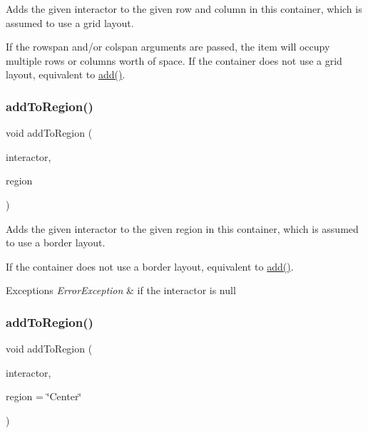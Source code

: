 Adds the given interactor to the given row and column in this container, which is assumed to use a grid layout. 

If the rowspan and/or colspan arguments are passed, the item will occupy multiple rows or columns\textquotesingle{} worth of space. If the container does not use a grid layout, equivalent to \mbox{\hyperlink{classGContainer_a6f99b7c841256dbdc5acaafbbca4e685}{add()}}. \mbox{\label{classGContainer_aab55413917cdbb2e0560ab415d59fd1f}} 
\subsubsection{\texorpdfstring{add\+To\+Region()}{addToRegion()}\hspace{0.1cm}{\footnotesize\ttfamily [1/4]}}
{\footnotesize\ttfamily void add\+To\+Region (\begin{DoxyParamCaption}\item[{\mbox{\hyperlink{classGInteractor}{G\+Interactor}} $\ast$}]{interactor,  }\item[{\mbox{\hyperlink{classGContainer_a81a01a86de31071a92e6cce0bab9bc4b}{Region}}}]{region }\end{DoxyParamCaption})\hspace{0.3cm}{\ttfamily [virtual]}}



Adds the given interactor to the given region in this container, which is assumed to use a border layout. 

If the container does not use a border layout, equivalent to \mbox{\hyperlink{classGContainer_a6f99b7c841256dbdc5acaafbbca4e685}{add()}}. 
\begin{DoxyExceptions}{Exceptions}
{\em Error\+Exception} & if the interactor is null \\
\hline
\end{DoxyExceptions}
\mbox{\label{classGContainer_a9c8e600889001e6e72d3548918a6baff}} 
\subsubsection{\texorpdfstring{add\+To\+Region()}{addToRegion()}\hspace{0.1cm}{\footnotesize\ttfamily [2/4]}}
{\footnotesize\ttfamily void add\+To\+Region (\begin{DoxyParamCaption}\item[{\mbox{\hyperlink{classGInteractor}{G\+Interactor}} $\ast$}]{interactor,  }\item[{const std\+::string \&}]{region = {\ttfamily \char`\"{}Center\char`\"{}} }\end{DoxyParamCaption})\hspace{0.3cm}{\ttfamily [virtual]}}



